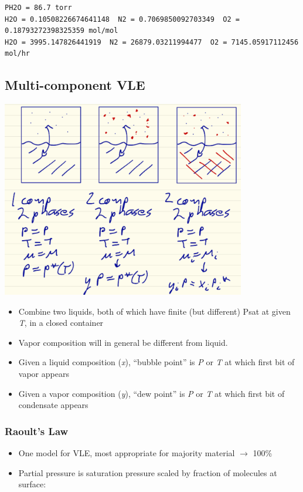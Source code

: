 \documentclass[11pt]{article}
\begin{document}
\begin{verbatim}
PH2O = 86.7 torr
H2O = 0.10508226674641148  N2 = 0.7069850092703349  O2 = 0.18793272398325359 mol/mol
H2O = 3995.147826441919  N2 = 26879.03211994477  O2 = 7145.05917112456 mol/hr
\end{verbatim}

\subsection{Multi-component VLE}
\label{sec-8-4}

\includegraphics[width=0.8\textwidth]{./figs/VLE.png}

\begin{itemize}
\item Combine two liquids, both of which have finite (but different) Psat at given
\emph{T}, in a closed container
\item Vapor composition will in general be different from liquid.
\item Given a liquid composition (\emph{x}), ``bubble point'' is \emph{P} or \emph{T} at which first bit of vapor appears
\item Given a vapor composition (\emph{y}), ``dew point'' is \emph{P} or \emph{T} at which first bit of condensate appears
\end{itemize}

\subsubsection{Raoult's Law}
\label{sec-8-4-1}
\begin{itemize}
\item One model for VLE, most appropriate for majority material $\to$ 100\%
\item Partial pressure is saturation pressure scaled by fraction of molecules at surface:
\end{itemize}
\end{document}
